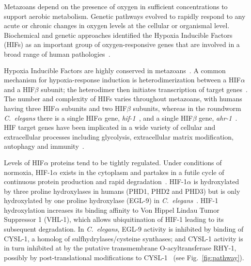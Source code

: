 \documentclass[10pt, onecolumn]{article}
\newcommand{\cel}{\emph{C.~elegans}}
\newcommand{\gene}[1]{\emph{#1}}
\newcommand{\eglp}{EGL-9}
\newcommand{\rhyp}{RHY-1}
\newcommand{\vhlp}{VHL-1}
\newcommand{\hifp}{HIF-1}
\newcommand{\cyslp}{CYSL-1}
\begin{document}
Metazoans depend on the presence of oxygen in sufficient concentrations to
support aerobic metabolism. Genetic pathways evolved to rapidly respond to any
acute or chronic changes in oxygen levels at the cellular or organismal level.
Biochemical and genetic approaches identified the Hypoxia Inducible Factors
(HIFs) as an important group of oxygen-responsive genes that are involved in a
broad range of human pathologies~\cite{Semenza2012}.

Hypoxia Inducible Factors are highly conserved in metazoans~\cite{Loenarz2011}.
A common mechanism for hypoxia-response induction is heterodimerization between a
HIF$\alpha$ and a HIF$\beta$ subunit; the heterodimer then initiates
transcription of target genes~\cite{Jiang1996}. The number and complexity of
HIFs varies throughout metazoans, with humans having three HIF$\alpha$ subunits
and two HIF$\beta$ subunits, whereas in the roundworm \cel{} there is a single
HIF$\alpha$ gene, \gene{hif-1}~\cite{Jiang2001}, and a single HIF$\beta$
gene, \gene{ahr-1}~\cite{Powell-Coffman1998}. HIF target genes have been implicated
in a wide variety of cellular and extracellular processes including glycolysis,
extracellular matrix modification, autophagy and immunity~\cite{Semenza1994,
Bishop2004,Shen2005,Bellier2009,Semenza2012}.

Levels of HIF$\alpha$ proteins tend to be tightly regulated. Under conditions of
normoxia, \hifp{}$\alpha$ exists in the cytoplasm and partakes in a futile cycle
of continuous protein production and rapid degradation~\cite{Huang1996}.
\hifp{}$\alpha$ is hydroxylated by three proline hydroxylases
in humans (PHD1, PHD2 and PHD3) but is only hydroxylated by one proline
hydroxylase (\eglp{}) in \cel{}~\cite{Kaelin2008}. \hifp{} hydroxylation
increases its binding affinity to Von Hippel Lindau Tumor Suppressor 1
(\vhlp{}), which allows ubiquitination of \hifp{} leading to its subsequent
degradation. In \cel{}, \eglp{} activity is inhibited by binding of \cyslp{}, a
homolog of sulfhydrylases/cysteine synthases; and \cyslp{} activity is in turn
inhibited at by the putative transmembrane O-acyltransferase \rhyp{},
possibly by post-translational modifications to \cyslp{}~\cite{Ma2012} (see
Fig.~\ref{fig:pathway}).
\end{document}
